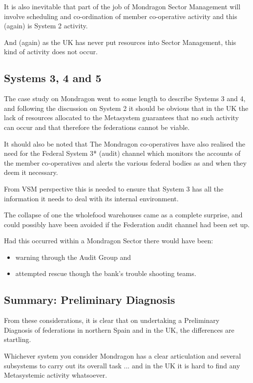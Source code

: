 It is also inevitable that part of the job of Mondragon Sector Management will involve scheduling and co-ordination of member co-operative activity and this (again) is System 2 activity.

And (again) as the UK has never put resources into Sector Management, this kind of activity does not occur.

\subsection*{Systems 3, 4 and 5}
The case study on Mondragon went to some length to describe Systems 3 and 4, and following the discussion on System 2 it should be obvious that in the UK the lack of resources allocated to the Metasystem guarantees that no such activity can occur and that therefore the federations cannot be viable.

It should also be noted that The Mondragon co-operatives have also realised the need for the Federal System 3* (audit) channel which monitors the accounts of the member co-operatives and alerts the various federal bodies as and when they deem it necessary.

From VSM perspective this is needed to ensure that System 3 has all the information it needs to deal with its internal environment.

The collapse of one the wholefood warehouses came as a complete surprise, and could possibly have been avoided if the Federation audit channel had been set up.

Had this occurred within a Mondragon Sector there would have been:

\begin{itemize}
  \item warning through the Audit Group and

  \item attempted rescue though the bank's trouble shooting teams.

\end{itemize}

\subsection*{Summary: Preliminary Diagnosis}
From these considerations, it is clear that on undertaking a Preliminary Diagnosis of federations in northern Spain and in the UK, the differences are startling.

Whichever system you consider Mondragon has a clear articulation and several subsystems to carry out its overall task ... and in the UK it is hard to find any Metasystemic activity whatsoever.

